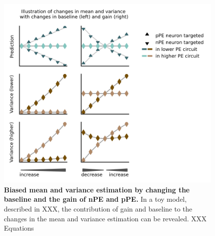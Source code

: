 \documentclass[10pt,a4paper,draft]{article}
\begin{document}
\begin{figure}[!h]
	\centering
    \includegraphics{../results/figures/final/Fig_4_S3}%
\caption{\footnotesize{\bf Biased mean and variance estimation by changing the baseline and the gain of nPE and pPE.}
In a toy model, described in XXX, the contribution of gain and baseline to the changes in the mean and variance estimation can be revealed. XXX Equations
}
\label{fig:Fig_4_S3}
\end{figure}
\end{document}
